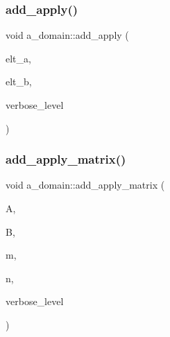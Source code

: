 \mbox{\label{classa__domain_ae0a23ffe3a8f1c79d2a32bda8dcf43ba}} 
\subsubsection{\texorpdfstring{add\+\_\+apply()}{add\_apply()}}
{\footnotesize\ttfamily void a\+\_\+domain\+::add\+\_\+apply (\begin{DoxyParamCaption}\item[{\mbox{\hyperlink{galois_8h_a09fddde158a3a20bd2dcadb609de11dc}{I\+NT}} $\ast$}]{elt\+\_\+a,  }\item[{\mbox{\hyperlink{galois_8h_a09fddde158a3a20bd2dcadb609de11dc}{I\+NT}} $\ast$}]{elt\+\_\+b,  }\item[{\mbox{\hyperlink{galois_8h_a09fddde158a3a20bd2dcadb609de11dc}{I\+NT}}}]{verbose\+\_\+level }\end{DoxyParamCaption})}

\mbox{\label{classa__domain_acd9cf54c0c4c1ca6292c993e89bf9020}} 
\subsubsection{\texorpdfstring{add\+\_\+apply\+\_\+matrix()}{add\_apply\_matrix()}}
{\footnotesize\ttfamily void a\+\_\+domain\+::add\+\_\+apply\+\_\+matrix (\begin{DoxyParamCaption}\item[{\mbox{\hyperlink{galois_8h_a09fddde158a3a20bd2dcadb609de11dc}{I\+NT}} $\ast$}]{A,  }\item[{\mbox{\hyperlink{galois_8h_a09fddde158a3a20bd2dcadb609de11dc}{I\+NT}} $\ast$}]{B,  }\item[{\mbox{\hyperlink{galois_8h_a09fddde158a3a20bd2dcadb609de11dc}{I\+NT}}}]{m,  }\item[{\mbox{\hyperlink{galois_8h_a09fddde158a3a20bd2dcadb609de11dc}{I\+NT}}}]{n,  }\item[{\mbox{\hyperlink{galois_8h_a09fddde158a3a20bd2dcadb609de11dc}{I\+NT}}}]{verbose\+\_\+level }\end{DoxyParamCaption})}

\mbox{\label{classa__domain_ac7988cb523f4a5d141f066c9e78a59a8}} 
